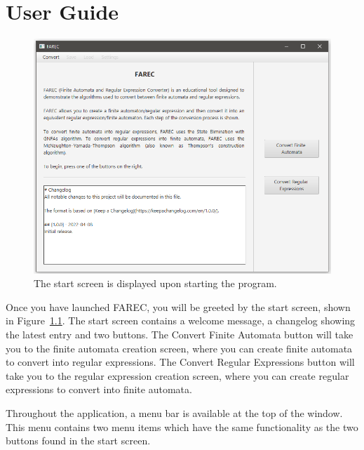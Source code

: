 \documentclass[12pt]{report}
\begin{document}
\tableofcontents

\chapter{User Guide} \label{UserGuide}

\begin{figure}[htb]
    \centering
    \includegraphics[width=\textwidth]{./Diagrams/StartScreen.png}
    \caption{The start screen is displayed upon starting the program.}
    \label{StartScreen}
\end{figure}

\needspace{2em}

Once you have launched FAREC, you will be greeted by the start screen, shown in
Figure~\ref{StartScreen}. The start screen contains a welcome message, a
changelog showing the latest entry and two buttons. The Convert Finite Automata
button will take you to the finite automata creation screen, where you can
create finite automata to convert into regular expressions. The Convert Regular
Expressions button will take you to the regular expression creation screen,
where you can create regular expressions to convert into finite automata.

Throughout the application, a menu bar is available at the top of the window.
This menu contains two menu items which have the same functionality as the two
buttons found in the start screen.

\end{document}
